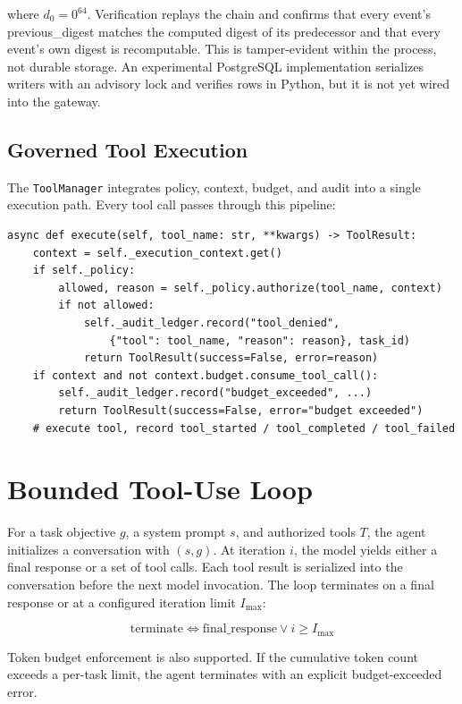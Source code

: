 \documentclass[11pt]{article}
\begin{document}
where \(d_0 = 0^{64}\). Verification replays the chain and confirms that every event's
previous\_digest matches the computed digest of its predecessor and that every event's
own digest is recomputable. This is tamper-evident within the process, not durable
storage. An experimental PostgreSQL implementation serializes writers with an advisory
lock and verifies rows in Python, but it is not yet wired into the gateway.

\subsection{Governed Tool Execution}

The \texttt{ToolManager} integrates policy, context, budget, and audit into a single execution path. Every tool call passes through this pipeline:

\begin{lstlisting}
async def execute(self, tool_name: str, **kwargs) -> ToolResult:
    context = self._execution_context.get()
    if self._policy:
        allowed, reason = self._policy.authorize(tool_name, context)
        if not allowed:
            self._audit_ledger.record("tool_denied",
                {"tool": tool_name, "reason": reason}, task_id)
            return ToolResult(success=False, error=reason)
    if context and not context.budget.consume_tool_call():
        self._audit_ledger.record("budget_exceeded", ...)
        return ToolResult(success=False, error="budget exceeded")
    # execute tool, record tool_started / tool_completed / tool_failed
\end{lstlisting}

\section{Bounded Tool-Use Loop}

For a task objective \(g\), a system prompt \(s\), and authorized tools \(T\), the agent initializes a conversation with \((s, g)\). At iteration \(i\), the model yields either a final response or a set of tool calls. Each tool result is serialized into the conversation before the next model invocation. The loop terminates on a final response or at a configured iteration limit \(I_{\max}\):

\begin{equation}
  \mathrm{terminate} \iff \mathrm{final\_response} \lor i \geq I_{\max}
\end{equation}

Token budget enforcement is also supported. If the cumulative token count exceeds a per-task limit, the agent terminates with an explicit budget-exceeded error.
\end{document}
